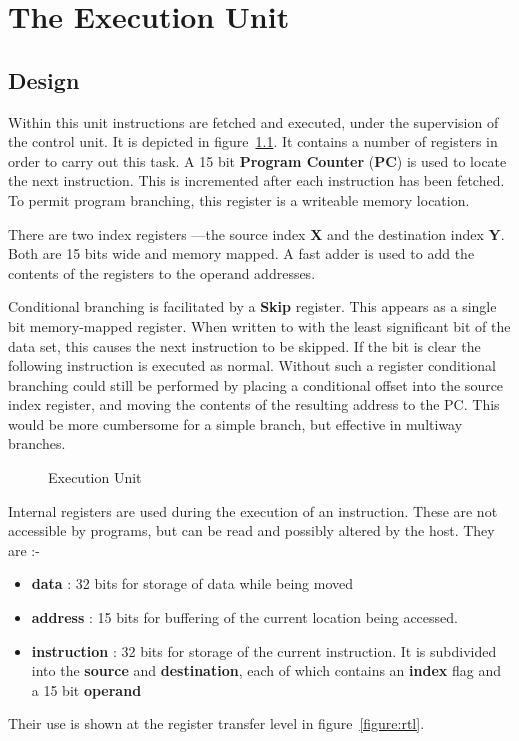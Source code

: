 \chapter{The Execution Unit}

\section{Design}

Within this unit instructions are fetched and executed,
under the supervision of the control unit. It is 
depicted in figure~\ref{fig:ex}.
It  contains a number of registers in order to carry out this
task.
A 15 bit {\bf Program Counter} ({\bf PC}) is used 
to locate the next instruction.
 This 
is incremented after each instruction has been fetched. 
To permit program branching, this register is a writeable  
memory location.

There are two index registers ---the source index {\bf X} and the 
destination index {\bf Y}.  Both are 15 bits wide and  
memory mapped. 
A fast adder is used to add the contents of the registers to the 
operand addresses. 


Conditional branching is facilitated by  a 
{\bf Skip} register. This appears as a single bit memory-mapped register.
When written to with the least significant bit of the data  set, this causes the 
next instruction  to be skipped. 
If the bit is clear the following instruction is executed as normal.
 Without such a register
conditional branching could still be performed by placing a conditional offset into the source index register, and moving the contents of the resulting address to the PC.
 This would be more cumbersome for a simple branch, but effective in multiway branches.


\begin{figure}
\vspace{20cm}
\caption{Execution Unit}
\label{fig:ex}
\end{figure}

{\samepage
Internal registers are used during the execution of an 
instruction. These are not accessible by programs, but can be 
read and possibly altered by the host. They are :-
\begin{itemize}
\item
{\bf data} : 32 bits for storage of data while being moved
\item
{\bf address} : 15 bits for buffering of the current location being 
accessed.
\item
{\bf instruction }: 32 bits for storage of the current instruction.
It is subdivided into the {\bf source} and {\bf destination}, each of which
contains an {\bf index} flag and a 15 bit {\bf operand}
\end{itemize}
Their use is shown at the register transfer level in figure~\ref{figure:rtl}.
}


